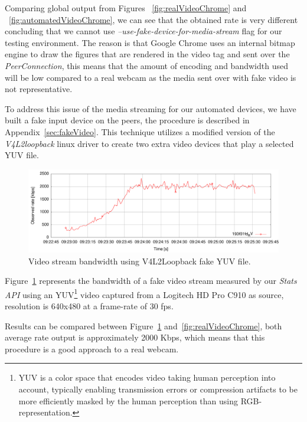 Comparing global output from Figures ~\ref{fig:realVideoChrome} and ~\ref{fig:automatedVideoChrome}, we can see that the obtained rate is very different concluding that we cannot use {\it --use-fake-device-for-media-stream} flag for our testing environment. The reason is that Google Chrome uses an internal bitmap engine to draw the figures that are rendered in the video tag and sent over the {\it PeerConnection}, this means that the amount of encoding and bandwidth used will be low compared to a real webcam as the media sent over with fake video is not representative.

To address this issue of the media streaming for our automated devices, we have built a fake input device on the peers, the procedure is described in Appendix~\ref{sec:fakeVideo}. This technique utilizes a modified version of the {\it V4L2loopback} linux driver to create two extra video devices that play a selected YUV file.  

 \begin{figure}[h]
  \centering
    \includegraphics[width=1\textwidth]{./figures/testV4L2niklas.pdf}
      \caption[Video stream bandwidth using V4L2Loopback fake YUV file]{Video stream bandwidth using V4L2Loopback fake YUV file.}
	\label{fig:testV4L2niklas}
\end{figure}

Figure~\ref{fig:testV4L2niklas} represents the bandwidth of a fake video stream measured by our {\it Stats API} using an YUV\footnote{YUV is a color space that encodes video taking human perception into account, typically enabling transmission errors or compression artifacts to be more efficiently masked by the human perception than using RGB-representation.} video captured from a Logitech HD Pro C910 as source, resolution is 640x480 at a frame-rate of 30 fps. 

Results can be compared between Figure~\ref{fig:testV4L2niklas} and~\ref{fig:realVideoChrome}, both average rate output is approximately 2000 Kbps, which means that this procedure is a good approach to a real webcam. 


